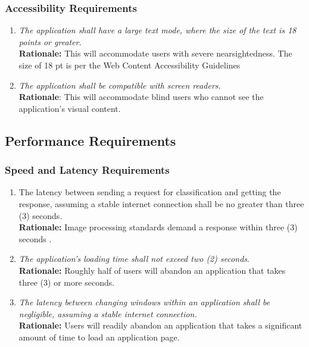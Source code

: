 \documentclass[]{article}
\begin{document}
\subsubsection{Accessibility Requirements}
\label{ssub:accessibility_requirements}
\begin{enumerate}[{UH-A}1. ]
	\item \textit{The application shall have a large text mode, where the size of the text is 18 points or greater.} \\\textbf{Rationale:} This will accommodate users with severe nearsightedness. The size of 18 pt is per the Web Content Accessibility Guidelines \cite{W3}
    \item \textit{The application shall be compatible with screen readers.} \\ \textbf{Rationale}: This will accommodate blind users who cannot see the application's visual content.
\end{enumerate}


\subsection{Performance Requirements}
\label{sub:performance_requirements}

\subsubsection{Speed and Latency Requirements}
\label{ssub:speed_and_latency_requirements}
\begin{enumerate}[{PR-SL}1. ]
	\item The latency between sending a request for classification and getting the response, assuming a stable internet connection shall be no greater than three (3) seconds. \\ \textbf{Rationale:} Image processing standards demand a response within three (3) seconds \cite{Umentis}.
    \item \textit{The application's loading time shall not exceed two (2) seconds}. \\ \textbf{Rationale:} Roughly half of users will abandon an application that takes three (3) or more seconds.\cite{StoryLy}
    \item \textit{The latency between changing windows within an application shall be negligible, assuming a stable internet connection.} \\ \textbf{Rationale:} Users will readily abandon an application that takes a significant amount of time to load an application page.
\end{enumerate}
\end{document}
